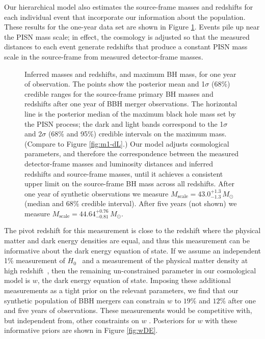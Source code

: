 \documentclass[modern]{aastex62}
\newcommand{\MScale}{M_{\mathrm{scale}}}
\newcommand{\MScaleOneYear}{43.0^{+1.3}_{-1.3} \, \MSun{}}
\newcommand{\MScaleFiveYear}{44.64^{+0.76}_{-0.81} \, \MSun{}}
\newcommand{\SigmawDEOneYear}{19 \%}
\newcommand{\SigmawDEFiveYear}{12 \%}
\newcommand{\MSun}{M_\odot}
\begin{document}
Our hierarchical model also estimates the source-frame masses and redshifts for
each individual event that incorporate our information about the population.
These results for the one-year data set are shown in Figure
\ref{fig:mass-correction}.  Events pile up near the \ac{PISN} mass scale; in
effect, the cosmology is adjusted so that the measured distances to each event
generate redshifts that produce a constant \ac{PISN} mass scale in the
source-frame from measured detector-frame masses.

\begin{figure}
%
  \caption{\label{fig:mass-correction} Inferred masses and
  redshifts, and maximum BH mass, for one year of observation.  The points show the posterior mean and 1$\sigma$ (68\%)
  credible ranges for the source-frame primary \ac{BH} masses and redshifts after
  one year of \ac{BBH} merger observations.  The horizontal line is the
  posterior median of the maximum black hole mass set by the PISN process; the
  dark and light bands correspond to the 1$\sigma$ and 2$\sigma$ (68\% and 95\%)
  credible intervals on the maximum mass.  (Compare to Figure \ref{fig:m1-dL}.)
  Our model adjusts cosmological parameters, and therefore the correspondence
  between the measured detector-frame masses and luminosity distances and
  inferred redshifts and source-frame masses, until it achieves a consistent
  upper limit on the source-frame \ac{BH} mass across all redshifts.  After one
  year of synthetic observations we measure $\MScale{} = \MScaleOneYear{}$ (median
  and 68\% credible interval).  After five years (not shown) we measure $\MScale{}
  = \MScaleFiveYear{}$.}
%
\end{figure}

The pivot redshift for this measurement is close to the redshift where the
physical matter and dark energy densities are equal, and thus this measurement
can be informative about the dark energy equation of state.  If we assume an
independent 1\% measurement of $H_0$~\citep[as could be obtained from \ac{GW}
observations of \ac{BNS} mergers with identified electromagnetic counterparts;][]{Chen2017} and a measurement of the physical matter density at high
redshift~\citep[as obtained by the Planck satellite's measurements of the \ac{CMB};][]{Planck2016}, then the remaining un-constrained parameter in our
cosmological model is $w$, the dark energy equation of state.  Imposing these
additional measurements as a tight prior on the relevant parameters, we find
that our synthetic population of \ac{BBH} mergers can constrain $w$ to
$\SigmawDEOneYear{}$ and $\SigmawDEFiveYear{}$ after one and five years of
observations.  These measurements would be competitive with, but independent
from, other constraints on $w$ \citep[e.g., see][]{2019PhRvL.122q1301A}.  Posteriors for $w$ with these
informative priors are shown in Figure \ref{fig:wDE}.
\end{document}
